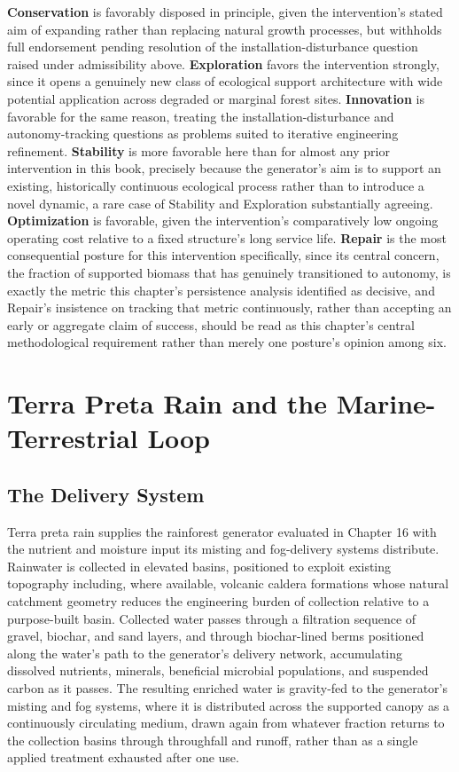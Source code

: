 \documentclass[11pt,oneside]{book}
\begin{document}
\textbf{Conservation} is favorably disposed in principle, given the intervention's stated aim of expanding rather than replacing natural growth processes, but withholds full endorsement pending resolution of the installation-disturbance question raised under admissibility above. \textbf{Exploration} favors the intervention strongly, since it opens a genuinely new class of ecological support architecture with wide potential application across degraded or marginal forest sites. \textbf{Innovation} is favorable for the same reason, treating the installation-disturbance and autonomy-tracking questions as problems suited to iterative engineering refinement. \textbf{Stability} is more favorable here than for almost any prior intervention in this book, precisely because the generator's aim is to support an existing, historically continuous ecological process rather than to introduce a novel dynamic, a rare case of Stability and Exploration substantially agreeing. \textbf{Optimization} is favorable, given the intervention's comparatively low ongoing operating cost relative to a fixed structure's long service life. \textbf{Repair} is the most consequential posture for this intervention specifically, since its central concern, the fraction of supported biomass that has genuinely transitioned to autonomy, is exactly the metric this chapter's persistence analysis identified as decisive, and Repair's insistence on tracking that metric continuously, rather than accepting an early or aggregate claim of success, should be read as this chapter's central methodological requirement rather than merely one posture's opinion among six.

\chapter{Terra Preta Rain and the Marine-Terrestrial Loop}

\section*{The Delivery System}

Terra preta rain supplies the rainforest generator evaluated in Chapter 16 with the nutrient and moisture input its misting and fog-delivery systems distribute. Rainwater is collected in elevated basins, positioned to exploit existing topography including, where available, volcanic caldera formations whose natural catchment geometry reduces the engineering burden of collection relative to a purpose-built basin. Collected water passes through a filtration sequence of gravel, biochar, and sand layers, and through biochar-lined berms positioned along the water's path to the generator's delivery network, accumulating dissolved nutrients, minerals, beneficial microbial populations, and suspended carbon as it passes. The resulting enriched water is gravity-fed to the generator's misting and fog systems, where it is distributed across the supported canopy as a continuously circulating medium, drawn again from whatever fraction returns to the collection basins through throughfall and runoff, rather than as a single applied treatment exhausted after one use.
\end{document}
